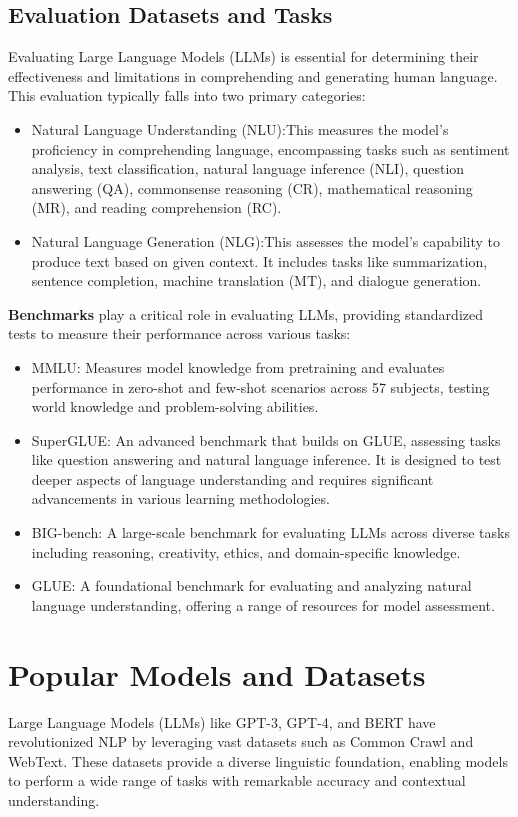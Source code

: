 \subsection{Evaluation Datasets and Tasks}
Evaluating Large Language Models (LLMs) is essential for determining their effectiveness and limitations in comprehending and generating human language. This evaluation typically falls into two primary categories:
\begin{itemize}
	\item Natural Language Understanding (NLU):This measures the model's proficiency in comprehending language, encompassing tasks such as sentiment analysis, text classification, natural language inference (NLI), question answering (QA), commonsense reasoning (CR), mathematical reasoning (MR), and reading comprehension (RC).
	\item Natural Language Generation (NLG):This assesses the model's capability to produce text based on given context. It includes tasks like summarization, sentence completion, machine translation (MT), and dialogue generation.
\end{itemize}
\textbf{Benchmarks} play a critical role in evaluating LLMs, providing standardized tests to measure their performance across various tasks:
\begin{itemize}
	\item MMLU: Measures model knowledge from pretraining and evaluates performance in zero-shot and few-shot scenarios across 57 subjects, testing world knowledge and problem-solving abilities.
	\item SuperGLUE: An advanced benchmark that builds on GLUE, assessing tasks like question answering and natural language inference. It is designed to test deeper aspects of language understanding and requires significant advancements in various learning methodologies.
	\item BIG-bench: A large-scale benchmark for evaluating LLMs across diverse tasks including reasoning, creativity, ethics, and domain-specific knowledge.
	\item GLUE: A foundational benchmark for evaluating and analyzing natural language understanding, offering a range of resources for model assessment\cite{Naveed2024}.
\end{itemize}
\section{Popular Models and Datasets}
Large Language Models (LLMs) like GPT-3, GPT-4, and BERT have revolutionized NLP by leveraging vast datasets such as Common Crawl and WebText. These datasets provide a diverse linguistic foundation, enabling models to perform a wide range of tasks with remarkable accuracy and contextual understanding.
